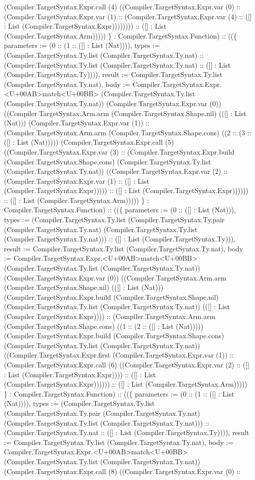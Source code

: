 \documentclass[11pt]{article}
\begin{document}
(Compiler.TargetSyntax.Expr.call (4) ((Compiler.TargetSyntax.Expr.var (0) :: (Compiler.TargetSyntax.Expr.var (1) :: (Compiler.TargetSyntax.Expr.var (4) :: ([] : List (Compiler.TargetSyntax.Expr)))))))) :: ([] : List (Compiler.TargetSyntax.Arm))))) \} : Compiler.TargetSyntax.Function) :: ((\{ parameters := (0 :: (1 :: ([] : List (Nat)))), types := (Compiler.TargetSyntax.Ty.list (Compiler.TargetSyntax.Ty.nat) :: (Compiler.TargetSyntax.Ty.list (Compiler.TargetSyntax.Ty.nat) :: ([] : List (Compiler.TargetSyntax.Ty)))), result := Compiler.TargetSyntax.Ty.list (Compiler.TargetSyntax.Ty.nat), body := Compiler.TargetSyntax.Expr.<U+00AB>match<U+00BB> (Compiler.TargetSyntax.Ty.list (Compiler.TargetSyntax.Ty.nat)) (Compiler.TargetSyntax.Expr.var (0)) ((Compiler.TargetSyntax.Arm.arm (Compiler.TargetSyntax.Shape.nil) (([] : List (Nat))) (Compiler.TargetSyntax.Expr.var (1)) :: (Compiler.TargetSyntax.Arm.arm (Compiler.TargetSyntax.Shape.cons) ((2 :: (3 :: ([] : List (Nat))))) (Compiler.TargetSyntax.Expr.call (5) ((Compiler.TargetSyntax.Expr.var (3) :: (Compiler.TargetSyntax.Expr.build (Compiler.TargetSyntax.Shape.cons) (Compiler.TargetSyntax.Ty.list (Compiler.TargetSyntax.Ty.nat)) ((Compiler.TargetSyntax.Expr.var (2) :: (Compiler.TargetSyntax.Expr.var (1) :: ([] : List (Compiler.TargetSyntax.Expr))))) :: ([] : List (Compiler.TargetSyntax.Expr)))))) :: ([] : List (Compiler.TargetSyntax.Arm))))) \} : Compiler.TargetSyntax.Function) :: ((\{ parameters := (0 :: ([] : List (Nat))), types := (Compiler.TargetSyntax.Ty.list (Compiler.TargetSyntax.Ty.pair (Compiler.TargetSyntax.Ty.nat) (Compiler.TargetSyntax.Ty.list (Compiler.TargetSyntax.Ty.nat))) :: ([] : List (Compiler.TargetSyntax.Ty))), result := Compiler.TargetSyntax.Ty.list (Compiler.TargetSyntax.Ty.nat), body := Compiler.TargetSyntax.Expr.<U+00AB>match<U+00BB> (Compiler.TargetSyntax.Ty.list (Compiler.TargetSyntax.Ty.nat)) (Compiler.TargetSyntax.Expr.var (0)) ((Compiler.TargetSyntax.Arm.arm (Compiler.TargetSyntax.Shape.nil) (([] : List (Nat))) (Compiler.TargetSyntax.Expr.build (Compiler.TargetSyntax.Shape.nil) (Compiler.TargetSyntax.Ty.list (Compiler.TargetSyntax.Ty.nat)) (([] : List (Compiler.TargetSyntax.Expr)))) :: (Compiler.TargetSyntax.Arm.arm (Compiler.TargetSyntax.Shape.cons) ((1 :: (2 :: ([] : List (Nat))))) (Compiler.TargetSyntax.Expr.build (Compiler.TargetSyntax.Shape.cons) (Compiler.TargetSyntax.Ty.list (Compiler.TargetSyntax.Ty.nat)) ((Compiler.TargetSyntax.Expr.first (Compiler.TargetSyntax.Expr.var (1)) :: (Compiler.TargetSyntax.Expr.call (6) ((Compiler.TargetSyntax.Expr.var (2) :: ([] : List (Compiler.TargetSyntax.Expr)))) :: ([] : List (Compiler.TargetSyntax.Expr)))))) :: ([] : List (Compiler.TargetSyntax.Arm))))) \} : Compiler.TargetSyntax.Function) :: ((\{ parameters := (0 :: (1 :: ([] : List (Nat)))), types := (Compiler.TargetSyntax.Ty.list (Compiler.TargetSyntax.Ty.pair (Compiler.TargetSyntax.Ty.nat) (Compiler.TargetSyntax.Ty.list (Compiler.TargetSyntax.Ty.nat))) :: (Compiler.TargetSyntax.Ty.nat :: ([] : List (Compiler.TargetSyntax.Ty)))), result := Compiler.TargetSyntax.Ty.list (Compiler.TargetSyntax.Ty.nat), body := Compiler.TargetSyntax.Expr.<U+00AB>match<U+00BB> (Compiler.TargetSyntax.Ty.list (Compiler.TargetSyntax.Ty.nat)) (Compiler.TargetSyntax.Expr.call (8) ((Compiler.TargetSyntax.Expr.var (0) :: 
\end{document}
